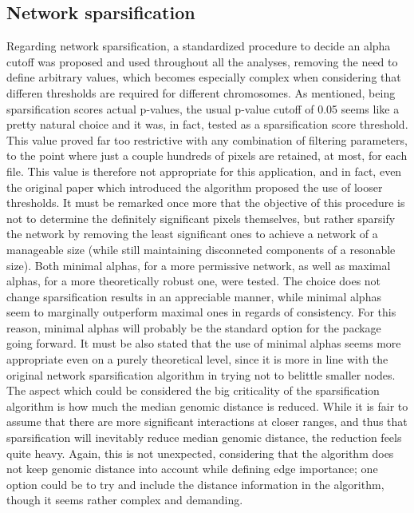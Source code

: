 \subsection{Network sparsification}
Regarding network sparsification, a standardized procedure to decide an alpha cutoff was proposed and used throughout all the analyses, removing the need to define arbitrary values, which becomes especially complex when considering that differen thresholds are required for different chromosomes. As mentioned, being sparsification scores actual p-values, the usual p-value cutoff of 0.05 seems like a pretty natural choice and it was, in fact, tested as a sparsification score threshold. This value proved far too restrictive with any combination of filtering parameters, to the point where just a couple hundreds of pixels are retained, at most, for each file. This value is therefore not appropriate for this application, and in fact, even the original paper which introduced the algorithm proposed the use of looser thresholds. It must be remarked once more that the objective of this procedure is not to determine the definitely significant pixels themselves, but rather sparsify the network by removing the least significant ones to achieve a network of a manageable size (while still maintaining disconneted components of a resonable size). Both minimal alphas, for a more permissive network, as well as maximal alphas, for a more theoretically robust one, were tested. The choice does not change sparsification results in an appreciable manner, while minimal alphas seem to marginally outperform maximal ones in regards of consistency. For this reason, minimal alphas will probably be the standard option for the package going forward. It must be also stated that the use of minimal alphas seems more appropriate even on a purely theoretical level, since it is more in line with the original network sparsification algorithm in trying not to belittle smaller nodes. The aspect which could be considered the big criticality of the sparsification algorithm is how much the median genomic distance is reduced. While it is fair to assume that there are more significant interactions at closer ranges, and thus that sparsification will inevitably reduce median genomic distance, the reduction feels quite heavy. Again, this is not unexpected, considering that the algorithm does not keep genomic distance into account while defining edge importance; one option could be to try and include the distance information in the algorithm, though it seems rather complex and demanding.



